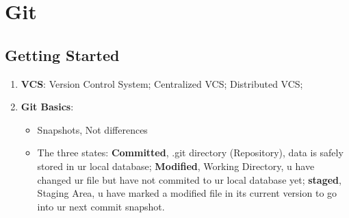 \documentclass[11pt,twoside,a4paper]{article}
\begin{document}
\section{Git} %
\subsection{Getting Started} %
\begin{enumerate}
  \item \textbf{VCS}: Version Control System; Centralized VCS; Distributed VCS;
  \item \textbf{Git Basics}:
    \begin{itemize}
      \item Snapshots, Not differences
      \item The three states: \textbf{Committed}, .git directory (Repository), data is safely stored in ur local database; \textbf{Modified}, Working Directory, u have changed ur file but have not commited to ur local database yet; \textbf{staged}, Staging Area, u have marked a modified file in its current version to go into ur next commit snapshot.
    \end{itemize}
\end{enumerate}
\end{document}
